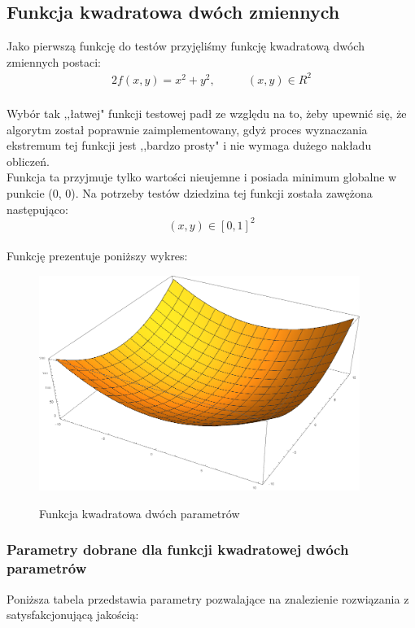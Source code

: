 \documentclass[twoside]{projektInzynierskiMS1}
\newcommand{\si}{ś}
\begin{document}
	\subsection{Funkcja kwadratowa dwóch zmiennych}
	Jako pierwszą funkcję do testów przyjęli\si my funkcję kwadratową dwóch zmiennych postaci:
\begin{alignat*}{2}
f(x, y) = x^2 + y^2,&\qquad  (x, y) \in R^2\\
\end{alignat*}

Wybór tak ,,łatwej" funkcji testowej padł ze względu na to, żeby upewnić się, że algorytm został poprawnie zaimplementowany, gdyż proces wyznaczania ekstremum tej funkcji jest ,,bardzo prosty" i nie wymaga dużego nakładu obliczeń. \\

Funkcja ta przyjmuje tylko warto\si ci nieujemne i posiada minimum globalne w punkcie (0, 0). Na potrzeby testów dziedzina tej funkcji została zawężona następująco:
\[(x, y)  \in [0,1]^2 \]\\ 


Funkcję prezentuje poniższy wykres:\\
\begin{figure}[H]
	\begin{center}
		\includegraphics[height=7cm]{pics/quadraticFunction1.png}\\
	\end{center}
	\caption{Funkcja kwadratowa dwóch parametrów}
\end{figure}

	\subsubsection{Parametry dobrane dla funkcji kwadratowej dwóch parametrów}
Poniższa tabela przedstawia parametry pozwalające na znalezienie rozwiązania z satysfakcjonującą jako\si cią:\\
\end{document}
